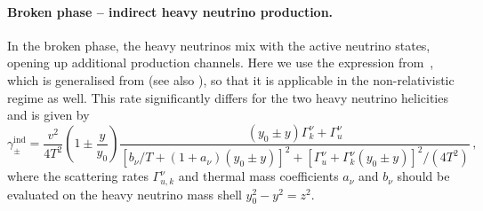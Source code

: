 \documentclass[12pt, a4paper]{article}
\newcommand\AG[1]{{\color{orange} [{AG: \bf #1}]}}
\begin{document}
\paragraph{Broken phase -- indirect heavy neutrino production.} 
In the broken phase, the heavy neutrinos mix with the active neutrino states, opening up additional production channels. Here we use the expression from~\cite{Klaric:2021cpi}, which is generalised from \cite{Eijima:2017anv} (see also \cite{Ghiglieri:2016xye}), so that it is applicable in the non-relativistic regime as well. This rate significantly differs for the two heavy neutrino helicities and is given by 
\begin{equation}\label{eq:gammaindpm}
  \gamma_\pm^\mathrm{ind} = \frac{v^2}{4T^2} \left(1\pm\frac{y}{y_0}\right) \frac{(y_0 \pm y) \Gamma_k^\nu + \Gamma_u^\nu}{[b_\nu/T+(1+a_\nu) (y_0 \pm y)]^2 + [\Gamma_u^\nu + \Gamma_k^\nu (y_0 \pm y)]^2/(4T^2)}\,,
 \end{equation}
where the scattering rates $\Gamma^\nu_{u,k}$ 
and thermal mass
coefficients $a_\nu$ and $b_\nu$ should be evaluated on the heavy neutrino mass shell $y_0^2 - y^2 = z^2$.
\end{document}
